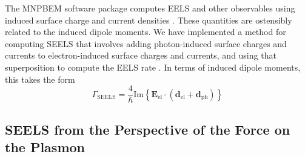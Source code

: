 \documentclass [11pt, proquest] {uwthesis}[2016/11/22]
\begin{document}
The MNPBEM software package computes EELS and other observables using induced surface charge and current densities \cite{Hohenester2012,Hohenester2014}. These quantities are ostensibly related to the induced dipole moments. We have implemented a method for computing SEELS that involves adding photon-induced surface charges and currents to electron-induced surface charges and currents, and using that superposition to compute the EELS rate \cite{vanAiken}. In terms of induced dipole moments, this takes the form
\begin{equation}
\Gamma_{\textrm{SEELS}} = \frac{4}{\hbar}\textrm{Im}\left\{ \textbf{E}_{\textrm{el}} \cdot (\textbf{d}_{\textrm{el}}+\textbf{d}_{\textrm{ph}})\right\}
\label{eels_dipoles}
\end{equation}

\subsection{SEELS from the Perspective of the Force on the Plasmon}
\end{document}
